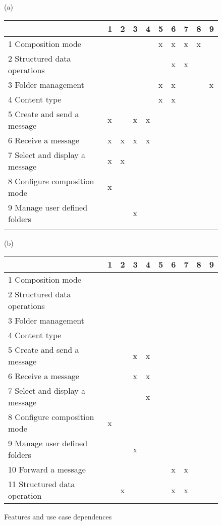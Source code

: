 \documentclass{acm_proc_article-sp}
\begin{document}
\begin{figure}[t]
\centering
\begin{scriptsize}
(a)
\begin{tabular}{llllllllll} \hline
								& 1 	& 2 	& 3 & 4 	& 5 	& 6 	& 7 	& 8 	& 9 	\\ \hline
1 Composition mode 				& 	& 	& 	& 	& x	& x	& x	& x	& 	\\
2 Structured data operations	 		& 	& 	& 	& 	& 	& x	& x	& 	& 	\\
3 Folder management 				& 	& 	& 	& 	& x	& x	& 	& 	& x	\\
4 Content type						& 	& 	& 	& 	& x	& x	& 	& 	& 	\\ \hline
5 Create and send a message 			& x	& 	& x	& x	& 	& 	& 	& 	& 	\\
6 Receive a message 				& x	& x	& x	& x	& 	&	& 	& 	& 	\\
7 Select and display a message 		& x	& x	& 	& 	& 	& 	& 	& 	& 	\\
8 Configure composition mode 		& x	& 	& 	& 	& 	& 	& 	& 	& 	\\
9 Manage user defined folders 		& 	& 	& x	& 	& 	& 	& 	& 	& 	\\ \hline \\
\end{tabular}
(b)
\begin{tabular}{llllllllll} \hline
								& 1 	& 2 	& 3 & 4 	& 5 	& 6 	& 7 	& 8 	& 9 	 \\ \hline
1 Composition mode 				& 	& 	& 	& 	& 	& 	& 	& 	& 		\\
2 Structured data operations	 		& 	& 	& 	& 	& 	& 	& 	& 	& 	\\
3 Folder management 				& 	& 	& 	& 	& 	& 	& 	& 	& 	\\
4 Content type						& 	& 	& 	& 	& 	& 	& 	& 	& 	\\ \hline
5 Create and send a message 			& 	& 	& x	& x	& 	& 	& 	& 	& 	\\
6 Receive a message 				& 	& 	& x	& x	& 	&	& 	& 	& 	\\
7 Select and display a message 		& 	& 	& 	& x	& 	& 	& 	& 	& 	\\
8 Configure composition mode 		& x	& 	& 	& 	& 	& 	& 	& 	& 	\\
9 Manage user defined folders 		& 	& 	& x	& 	& 	& 	& 	& 	& 	\\ 
10 Forward a message		 		& 	& 	& 	& 	& 	& x	& x	& 	& 	\\ 
11 Structured data operation	 		& 	& x	& 	& 	& 	& x	& x	& 	& 	\\ \hline 
\end{tabular}
\end{scriptsize}
\caption{Features and use case dependences}
\label{dsm:ll}
\end{figure}   
\end{document}
